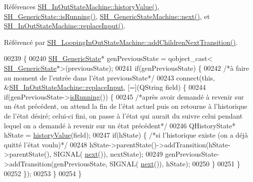 Références \hyperlink{classSH__InOutStateMachine_af71bfdb3b59b7bf2763588b513b4205f}{S\-H\-\_\-\-In\-Out\-State\-Machine\-::history\-Value()}, \hyperlink{classSH__GenericState_a5f731810dad0cacd28828ccbf1539e4e}{S\-H\-\_\-\-Generic\-State\-::is\-Running()}, \hyperlink{classSH__GenericStateMachine_af4771d31d87951c997fba1633c2d67f6}{S\-H\-\_\-\-Generic\-State\-Machine\-::next()}, et \hyperlink{classSH__InOutStateMachine_a9fa5db44086de2576c812f631aa4f60a}{S\-H\-\_\-\-In\-Out\-State\-Machine\-::replace\-Input()}.



Référencé par \hyperlink{classSH__LoopingInOutStateMachine_abfae9f47019379f270496de46845c729}{S\-H\-\_\-\-Looping\-In\-Out\-State\-Machine\-::add\-Children\-Next\-Transition()}.


\begin{DoxyCode}
00239 \{
00240         \hyperlink{classSH__GenericState}{SH\_GenericState}* genPreviousState = qobject\_cast<
      \hyperlink{classSH__GenericState}{SH\_GenericState}*>(previousState);
00241     \textcolor{keywordflow}{if}(genPreviousState) \{
00242         \textcolor{comment}{/*à faire au moment de l'entrée dans l'état previousState*/}
00243         connect(\textcolor{keyword}{this}, &\hyperlink{classSH__InOutStateMachine_a9fa5db44086de2576c812f631aa4f60a}{SH\_InOutStateMachine::replaceInput}, [=](QString 
      field) \{
00244             \textcolor{keywordflow}{if}(genPreviousState->\hyperlink{classSH__GenericState_a5f731810dad0cacd28828ccbf1539e4e}{isRunning}()) \{
00245                 \textcolor{comment}{/*après avoir demandé à revenir sur un état précédent, on attend la fin de l'état actuel
       puis on retourne à l'historique de l'état désiré; celui-ci fini, on passe à l'état qui aurait du suivre celui
       pendant lequel on a demandé à revenir sur un état précédent*/}
00246                 QHistoryState* hState = \hyperlink{classSH__InOutStateMachine_af71bfdb3b59b7bf2763588b513b4205f}{historyValue}(field);
00247                 \textcolor{keywordflow}{if}(hState) \{ \textcolor{comment}{/*si l'historique existe (on a déjà quitté l'état voulu)*/}
00248                     hState->parentState()->addTransition(hState->parentState(), SIGNAL(
      \hyperlink{classSH__GenericStateMachine_af4771d31d87951c997fba1633c2d67f6}{next}()), nextState);
00249                     genPreviousState->addTransition(genPreviousState, SIGNAL(
      \hyperlink{classSH__GenericStateMachine_af4771d31d87951c997fba1633c2d67f6}{next}()), hState);
00250                 \}
00251             \}
00252         \});
00253     \}
00254 \}
\end{DoxyCode}



